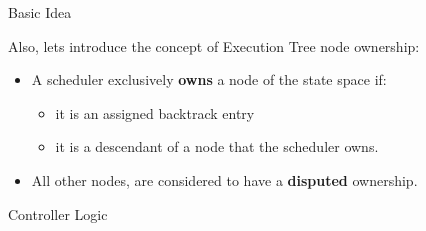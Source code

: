 \begin{frame} {Basic Idea}

Also, lets introduce the concept of Execution Tree node ownership:

\begin{itemize}[<+->]
  \item A scheduler exclusively \textbf{owns} a node of the state space if: 
    \begin{itemize}
    \item it is an assigned backtrack entry
    \item it is a descendant of a node that the scheduler owns.
    \end{itemize}
  \item All other nodes, are considered to have a \textbf{disputed} ownership.
\end{itemize}

\end{frame}

\begin{frame} {Controller Logic}

\begin{algorithm}[H]
    \label{controllerloop}

\end{algorithm}

\end{frame}

